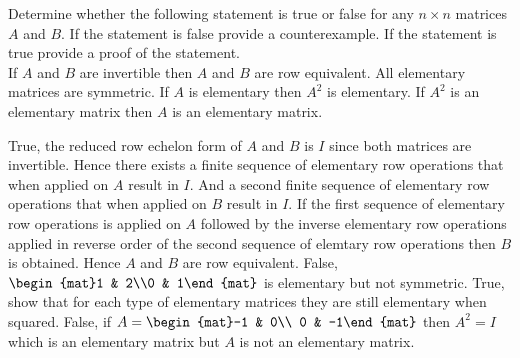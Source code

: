 
\begin{Exercise}[
name={},
title={}, 
difficulty=0,
origin={\cite{BS, YL}}]
Determine whether the following statement is true or false for any $n\times n$
matrices $A$ and $B$.  If the statement is false provide a counterexample. If the
statement is true provide a proof of the statement.\\

\Question If $A$ and $B$ are invertible then $A$ and $B$ are row equivalent.
\Question All elementary matrices are symmetric.
\Question If $A$ is elementary then $A^2$ is elementary.
\Question If $A^2$ is an elementary matrix then $A$ is an elementary matrix.
\end{Exercise}

\begin{Answer}
\Question True, the reduced row echelon form of $A$ and $B$ is $I$ since both matrices are invertible.  Hence there exists a finite sequence of elementary row operations that when applied on $A$ result in $I$. And a second finite sequence of elementary row operations that when applied on $B$ result in $I$.  If the first sequence of elementary row operations is applied on $A$ followed by the inverse elementary row operations applied in reverse order of the second sequence of elemtary row operations then $B$ is obtained.  Hence $A$ and $B$ are row equivalent.
\Question False, $\begin{mat}1 & 2\\0 & 1\end{mat}$ is elementary but not symmetric.
\Question True, show that for each type of elementary matrices they are still elementary when squared.
\Question False, if $A=\begin{mat}-1 & 0\\ 0 & -1\end{mat}$ then $A^2=I$ which is an elementary matrix but $A$ is not an elementary matrix.
\end{Answer}
